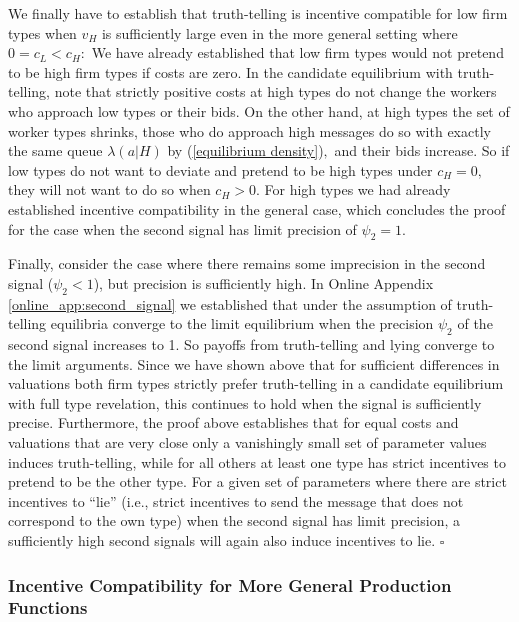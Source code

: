 \documentclass[12pt]{article}
\begin{document}
We finally have to establish that truth-telling is incentive compatible for
low firm types when $v_{H}$ is sufficiently large even in the more general
setting where $0=c_{L}<c_{H}:$ We have already established that low firm
types would not pretend to be high firm types if costs are zero. In the
candidate equilibrium with truth-telling, note that strictly positive costs
at high types do not change the workers who approach low types or their
bids. On the other hand, at high types the set of worker types shrinks,
those who do approach high messages do so with exactly the same queue $%
\lambda (a|H)$ by (\ref{equilibrium density})$,$ and their bids increase. So
if low types do not want to deviate and pretend to be high types under $%
c_{H}=0,$ they will not want to do so when $c_{H}>0.$ For high types we had
already established incentive compatibility in the general case, which
concludes the proof for the case when the second signal has limit precision of $\psi_2=1$. 

Finally, consider the case where there remains some imprecision in the second signal ($\psi_2 <1$), but precision is sufficiently high. In Online Appendix \ref{online_app:second_signal} we established that under the assumption of truth-telling equilibria converge to the limit equilibrium when the precision $\psi_2$ of the second signal increases to 1. So payoffs from truth-telling and lying converge to the limit arguments. Since we have shown above that for sufficient differences in valuations both firm types strictly prefer truth-telling in a candidate equilibrium with full type revelation, this continues to hold when the signal is sufficiently precise. Furthermore, the proof above establishes that for equal costs and valuations that are very close only a vanishingly small set of parameter values induces truth-telling, while for all others at least one type has strict incentives to pretend to be the other type. For a given set of parameters where there are strict incentives to ``lie'' (i.e., strict incentives to send the message that does not correspond to the own type) when the second signal has limit precision, a sufficiently high second signals will again also induce incentives to lie. $\square $ 

\bigskip




\subsubsection{Incentive Compatibility for More General Production Functions}
\label{online_app:ic_general_prod}
\end{document}
